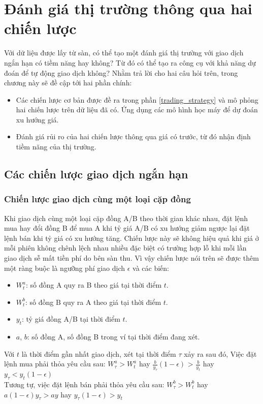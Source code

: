 \chapter{Đánh giá thị trường thông qua hai chiến lược}
\label{chap-trading_strategies}
Với dữ liệu được lấy từ sàn, có thể tạo một đánh giá thị trường với giao dịch ngắn hạn có tiềm năng hay không? Từ đó có thể tạo ra công cụ với khả năng dự đoán để tự động giao dịch không?  Nhằm trả lời cho hai câu hỏi trên, trong chương này sẽ đề cập tới hai phần chính:

\begin{itemize}
    \item Các chiến lược cơ bản được đề ra trong phần \ref{trading_strategy} và mô phỏng hai chiến lược trên dữ liệu đã có. Ứng dụng các mô hình học máy để dự đoán xu hướng giá.
    \item  Đánh giá rủi ro của hai chiến lược thông qua giá có trước, từ đó nhận định tiềm năng của thị trường.
    \end{itemize}
\section{Các chiến lược giao dịch ngắn hạn}\label{strategy_describing}

\subsection{Chiến lược giao dịch cùng một loại cặp đồng}\label{describe_strategy_1}
Khi giao dịch cùng một loại cặp đồng A/B theo thời gian khác nhau, đặt lệnh mua hay đổi đồng B để mua A khi tỷ giá A/B có xu hướng giảm ngược lại đặt lệnh bán khi tỷ giá có xu hướng tăng. Chiến lược này sẽ không hiệu quả khi giá ở mỗi phiên không chênh lệch nhau nhiều đặc biệt có trường hợp lỗ khi mỗi lần giao dịch sễ mất tiền phí do bên sàn thu. Vì vậy chiến lược nói trên sẽ được thêm một ràng buộc là  ngưỡng phí giao dịch $\epsilon$ và các biến:
\begin{itemize}
    \item $W^a_t$: số đồng A quy ra B theo giá tại thời điểm $t$.
    \item $W^b_t$: số đồng B quy ra A theo giá tại thời điểm $t$.
    \item $y_t$: tỷ giá đồng A/B tại thời điểm $t$.
    \item $a$, $b$: số đồng A, số đồng B trong ví tại thời điểm đang xét.
\end{itemize}
Với $t$ là thời điểm gần nhất giao dịch, xét tại thời điểm $\tau$ xảy ra sau đó, Việc đặt lệnh mua phải thỏa yêu cầu sau:
$W^a_\tau > W^a_t$ hay
$\frac{b}{y_\tau}(1-\epsilon)$ > $\frac{b}{y_t}$ hay $y_\tau < y_t(1 -\epsilon)$  \\
Tương tự, việc đặt lệnh bán phải thỏa yêu cầu sau:
$W^b_\tau > W^b_t$ hay
$a (1 - \epsilon) y_\tau > ay$ hay $y_\tau(1 -\epsilon) > y_t $ \\

